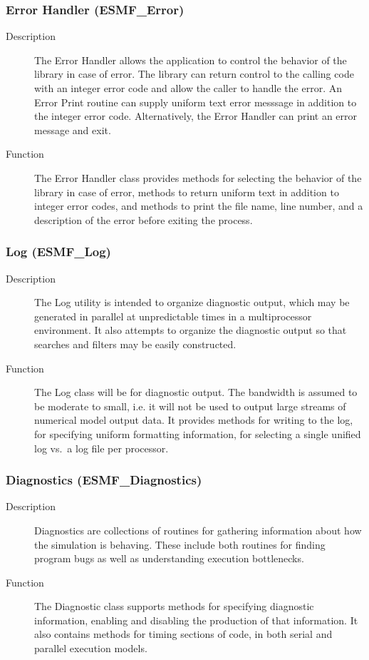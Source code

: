 \subsubsection{Error Handler (ESMF\_Error)}
\label{sec:error} 
\begin{description}
\item [Description] The Error Handler allows the application to control 
the behavior of the library in case of error.  The library can return
control to the calling code with an integer error code and allow the
caller to handle the error.  An Error Print routine can
supply uniform text error messsage in addition to the integer error code.
Alternatively, the Error Handler can print an error message and exit.
\item [Function] The Error Handler class provides methods for selecting
the behavior of the library in case of error, methods to return uniform
text in addition to integer error codes, and methods to print the file
name, line number, and a description of the error before exiting the process.
\end{description}

\subsubsection{Log (ESMF\_Log)}
\label{sec:log} 
\begin{description}
\item [Description] The Log utility is intended to organize diagnostic
output, which may be generated in parallel at unpredictable times in
a multiprocessor environment.  It also attempts to organize
the diagnostic output so that searches and filters may be easily constructed. 
\item [Function] The Log class will be for diagnostic output. 
The bandwidth is assumed to be moderate to small, i.e. it will not be used 
to output large streams of numerical model output data.  
It provides methods for writing to the log, for specifying uniform
formatting information, for selecting a single unified log vs.\  a log 
file per processor.
\end{description}

\subsubsection{Diagnostics (ESMF\_Diagnostics)}
\label{sec:diagnostics} 
\begin{description}
\item [Description] Diagnostics are collections of routines for
gathering information about how the simulation is behaving.  
These include both routines for finding program bugs
as well as understanding execution bottlenecks.
\item [Function] The Diagnostic class supports methods for specifying
diagnostic information, enabling and disabling the production of
that information.  It also contains methods for timing sections of
code, in both serial and parallel execution models.
\end{description}



